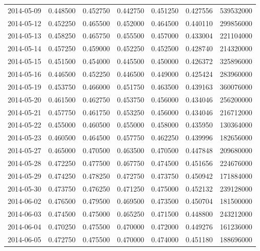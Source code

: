 \begin{tabular}{lrrrrrr}
2014-05-09 &    0.448500 &    0.452750 &    0.442750 &    0.451250 &    0.427556 &   539532000 \\
2014-05-12 &    0.452250 &    0.465500 &    0.452000 &    0.464500 &    0.440110 &   299856000 \\
2014-05-13 &    0.458250 &    0.465750 &    0.455500 &    0.457000 &    0.433004 &   221104000 \\
2014-05-14 &    0.457250 &    0.459000 &    0.452250 &    0.452500 &    0.428740 &   214320000 \\
2014-05-15 &    0.451500 &    0.454000 &    0.445500 &    0.450000 &    0.426372 &   325896000 \\
2014-05-16 &    0.446500 &    0.452250 &    0.446500 &    0.449000 &    0.425424 &   283960000 \\
2014-05-19 &    0.453750 &    0.466000 &    0.451750 &    0.463500 &    0.439163 &   360076000 \\
2014-05-20 &    0.461500 &    0.462750 &    0.453750 &    0.456000 &    0.434046 &   256200000 \\
2014-05-21 &    0.457750 &    0.461750 &    0.453250 &    0.456000 &    0.434046 &   216712000 \\
2014-05-22 &    0.455000 &    0.460500 &    0.455000 &    0.458000 &    0.435950 &   130364000 \\
2014-05-23 &    0.460500 &    0.464500 &    0.457750 &    0.462250 &    0.439996 &   182656000 \\
2014-05-27 &    0.465000 &    0.470500 &    0.463500 &    0.470500 &    0.447848 &   209680000 \\
2014-05-28 &    0.472250 &    0.477500 &    0.467750 &    0.474500 &    0.451656 &   224676000 \\
2014-05-29 &    0.474250 &    0.478250 &    0.472750 &    0.473750 &    0.450942 &   171884000 \\
2014-05-30 &    0.473750 &    0.476250 &    0.471250 &    0.475000 &    0.452132 &   239128000 \\
2014-06-02 &    0.476500 &    0.479500 &    0.469500 &    0.473500 &    0.450704 &   181500000 \\
2014-06-03 &    0.474500 &    0.475000 &    0.465250 &    0.471500 &    0.448800 &   243212000 \\
2014-06-04 &    0.470250 &    0.475500 &    0.470000 &    0.472000 &    0.449276 &   161236000 \\
2014-06-05 &    0.472750 &    0.475500 &    0.470000 &    0.474000 &    0.451180 &   188696000 \\

\end{tabular}
